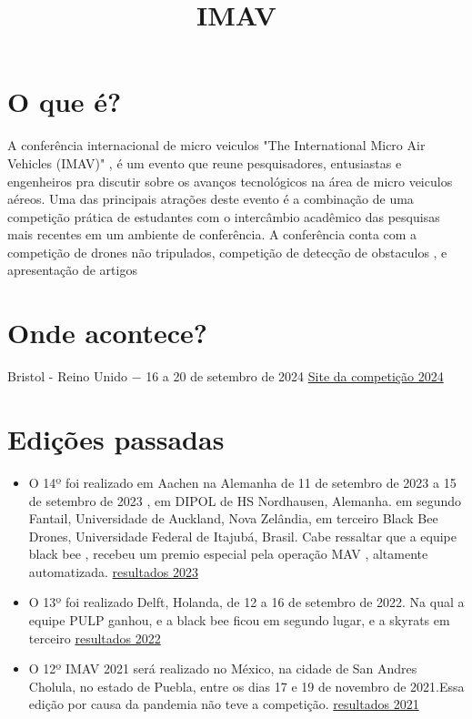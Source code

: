 \documentclass[letterpaper]{article}
\date{} %
\title{\textbf{IMAV}}
\begin{document}
\maketitle
\section{O que é?}
A conferência internacional de micro veiculos "The International Micro Air Vehicles (IMAV)" , é um evento que reune pesquisadores, entusiastas e engenheiros pra discutir sobre os avanços tecnológicos na área de micro veiculos aéreos. Uma das principais atrações deste evento é a combinação de uma competição prática de estudantes com o intercâmbio acadêmico das pesquisas mais recentes em um ambiente de conferência. A conferência conta com a competição de drones não tripulados, competição de detecção de obstaculos , e apresentação de artigos

\section{Onde acontece?}
Bristol -  Reino Unido $-$ 16 a 20 de setembro de 2024
\href{https://2024.imavs.org/}{Site da competição 2024}

\section {Edições passadas}

\begin{itemize}
    \item  O 14º foi realizado em Aachen na Alemanha de 11 de setembro de 2023 a 15 de setembro de 2023 , em DIPOL de HS Nordhausen, Alemanha. em segundo Fantail, Universidade de Auckland, Nova Zelândia, em terceiro Black Bee Drones, Universidade Federal de Itajubá, Brasil. Cabe ressaltar que a equipe black bee , recebeu um premio especial  pela operação MAV , altamente automatizada.
    \href{https://2023.imavs.org/index.php/results-for-imav2023/}{resultados 2023}
    \item O 13º  foi realizado Delft, Holanda, de 12 a 16 de setembro de 2022.
    Na qual a equipe PULP ganhou, e a black bee ficou em segundo lugar, e a skyrats em terceiro
    \href{https://www.imavs.org/2022/index.php/results/index.html}{resultados 2022}
    \item O 12º IMAV 2021 será realizado no México, na cidade de San Andres Cholula, no estado de Puebla, entre os dias 17 e 19 de novembro de 2021.Essa edição por causa da pandemia não teve a competição.
    \href{https://imav2021.inaoep.mx/index.php/portal/home}{resultados 2021}
\end{itemize}
\end{document}
